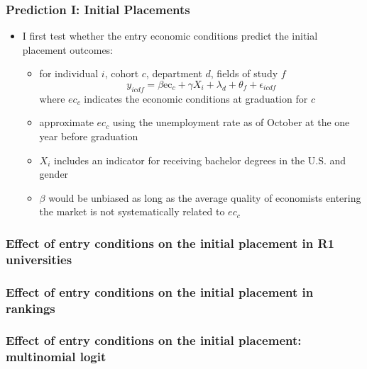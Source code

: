 \documentclass[11pt]{beamer}
\begin{document}
\begin{frame}
	\frametitle{Prediction I: Initial Placements}
	\begin{itemize}
		\item I first test whether the entry economic conditions predict the initial placement outcomes: 
		\begin{itemize}
			\item for individual $i$, cohort $c$, department $d$, fields of study $f$
		\begin{equation}
			\label{eq:eq1}
			y_{icdf} = \beta \text{ec}_{c}+\gamma X_{i}+\lambda_{d}+\theta_f  +\epsilon_{icdf}
		\end{equation}
	where $ec_c$ indicates the economic conditions at graduation for $c$
	\item  approximate $ec_c$  using the unemployment rate as of October at the one year before graduation
	\item $X_i$ includes an indicator for receiving bachelor degrees in the U.S. and gender
	\item  $\beta$ would be unbiased as long as the average quality of economists entering the market is not systematically related to $ec_c$
\end{itemize}
	\end{itemize}
\end{frame}




{
	\begin{frame}
		\frametitle{Effect of entry conditions on the initial placement in R1 universities}
		
	\end{frame}
}

{
	\begin{frame}
		\frametitle{Effect of entry conditions on the initial placement in rankings}
		
	\end{frame}
}

{
	\begin{frame}
		\frametitle{Effect of entry conditions on the initial placement: multinomial logit}
		
	\end{frame}
}
\end{document}
